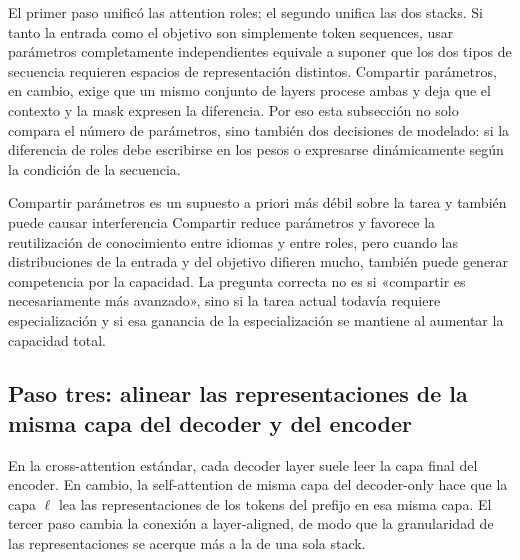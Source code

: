 El primer paso unificó las attention roles; el segundo unifica las dos stacks. Si tanto la entrada como el objetivo son simplemente token sequences, usar parámetros completamente independientes equivale a suponer que los dos tipos de secuencia requieren espacios de representación distintos. Compartir parámetros, en cambio, exige que un mismo conjunto de layers procese ambas y deja que el contexto y la mask expresen la diferencia. Por eso esta subsección no solo compara el número de parámetros, sino también dos decisiones de modelado: si la diferencia de roles debe escribirse en los pesos o expresarse dinámicamente según la condición de la secuencia.



\begin{warningbox}{Compartir parámetros es un supuesto a priori más débil sobre la tarea y también puede causar interferencia}
Compartir reduce parámetros y favorece la reutilización de conocimiento entre idiomas y entre roles, pero cuando las distribuciones de la entrada y del objetivo difieren mucho, también puede generar competencia por la capacidad. La pregunta correcta no es si «compartir es necesariamente más avanzado», sino si la tarea actual todavía requiere especialización y si esa ganancia de la especialización se mantiene al aumentar la capacidad total.
\end{warningbox}


\subsection{Paso tres: alinear las representaciones de la misma capa del decoder y del encoder}

En la cross-attention estándar, cada decoder layer suele leer la capa final del encoder. En cambio, la self-attention de misma capa del decoder-only hace que la capa $\ell$ lea las representaciones de los tokens del prefijo en esa misma capa. El tercer paso cambia la conexión a layer-aligned, de modo que la granularidad de las representaciones se acerque más a la de una sola stack.

